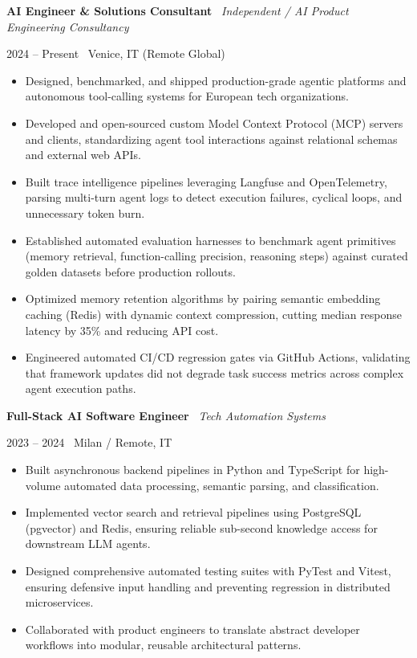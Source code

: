\documentclass[a4paper,10pt]{article}
\newcommand{\role}[4]{%
  \vspace{2pt}\noindent
  \begin{minipage}[t]{0.70\textwidth}\raggedright\textbf{#1} \textbullet\ \textit{#3}\end{minipage}%
  \hfill
  \begin{minipage}[t]{0.28\textwidth}\raggedleft\footnotesize\color{gray}#2 \textbullet\ #4\end{minipage}%
  \vspace{1pt}%
}
\begin{document}
\role{AI Engineer \& Solutions Consultant}{2024 -- Present}{Independent / AI Product Engineering Consultancy}{Venice, IT (Remote Global)}
\begin{itemize}
  \item Designed, benchmarked, and shipped production-grade agentic platforms and autonomous tool-calling systems for European tech organizations.
  \item Developed and open-sourced custom Model Context Protocol (MCP) servers and clients, standardizing agent tool interactions against relational schemas and external web APIs.
  \item Built trace intelligence pipelines leveraging Langfuse and OpenTelemetry, parsing multi-turn agent logs to detect execution failures, cyclical loops, and unnecessary token burn.
  \item Established automated evaluation harnesses to benchmark agent primitives (memory retrieval, function-calling precision, reasoning steps) against curated golden datasets before production rollouts.
  \item Optimized memory retention algorithms by pairing semantic embedding caching (Redis) with dynamic context compression, cutting median response latency by 35\% and reducing API cost.
  \item Engineered automated CI/CD regression gates via GitHub Actions, validating that framework updates did not degrade task success metrics across complex agent execution paths.
\end{itemize}

\vspace{3pt}
\role{Full-Stack AI Software Engineer}{2023 -- 2024}{Tech Automation Systems}{Milan / Remote, IT}
\begin{itemize}
  \item Built asynchronous backend pipelines in Python and TypeScript for high-volume automated data processing, semantic parsing, and classification.
  \item Implemented vector search and retrieval pipelines using PostgreSQL (pgvector) and Redis, ensuring reliable sub-second knowledge access for downstream LLM agents.
  \item Designed comprehensive automated testing suites with PyTest and Vitest, ensuring defensive input handling and preventing regression in distributed microservices.
  \item Collaborated with product engineers to translate abstract developer workflows into modular, reusable architectural patterns.
\end{itemize}
\end{document}
